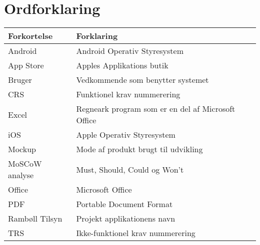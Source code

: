 \chapter*{Ordforklaring}

\begin{tabularx}{\textwidth}{l l X} \hline
	\textbf{Forkortelse}  & \textbf{Forklaring} \\ \hline
	Android& Android Operativ Styresystem \\
	App Store& Apples Applikations butik \\
	Bruger& Vedkommende som benytter systemet \\
	CRS& Funktionel krav nummerering \\
	Excel& Regneark program som er en del af Microsoft Office \\
	iOS& Apple Operativ Styresystem \\
	Mockup& Mode af produkt brugt til udvikling \\
	MoSCoW analyse& Must, Should, Could og Won't \\
	Office&  Microsoft Office& \\
	PDF& Portable Document Format \\
	Rambøll Tilsyn& Projekt applikationens navn \\
	TRS& Ikke-funktionel krav nummerering \\
	
\end{tabularx}